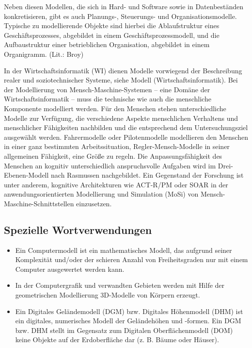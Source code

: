 \documentclass[a4paper, 12pt]{scrartcl}
\begin{document}
Neben diesen Modellen, die sich in Hard- und Software sowie in Datenbeständen konkretisieren, gibt es auch Planungs-, Steuerungs- und Organisationsmodelle. Typische zu modellierende Objekte sind hierbei die Ablaufstruktur eines Geschäftsprozesses, abgebildet in einem Geschäftsprozessmodell, und die Aufbaustruktur einer betrieblichen Organisation, abgebildet in einem Organigramm. (Lit.: Broy)

In der Wirtschaftsinformatik (WI) dienen Modelle vorwiegend der Beschreibung realer und soziotechnischer Systeme, siehe Modell (Wirtschaftsinformatik). Bei der Modellierung von Mensch-Maschine-Systemen – eine Domäne der Wirtschaftsinformatik – muss die technische wie auch die menschliche Komponente modelliert werden. Für den Menschen stehen unterschiedliche Modelle zur Verfügung, die verschiedene Aspekte menschlichen Verhaltens und menschlicher Fähigkeiten nachbilden und die entsprechend dem Untersuchungsziel ausgewählt werden. Fahrermodelle oder Pilotenmodelle modellieren den Menschen in einer ganz bestimmten Arbeitssituation, Regler-Mensch-Modelle in seiner allgemeinen Fähigkeit, eine Größe zu regeln. Die Anpassungsfähigkeit des Menschen an kognitiv unterschiedlich anspruchsvolle Aufgaben wird im Drei-Ebenen-Modell nach Rasmussen nachgebildet. Ein Gegenstand der Forschung ist unter anderem, kognitive Architekturen wie ACT-R/PM oder SOAR in der anwendungsorientierten Modellierung und Simulation (MoSi) von Mensch-Maschine-Schnittstellen einzusetzen.

\subsection*{Spezielle Wortverwendungen}
\begin{itemize}
    \item Ein Computermodell ist ein mathematisches Modell, das aufgrund seiner Komplexität und/oder der schieren Anzahl von Freiheitsgraden nur mit einem Computer ausgewertet werden kann.
    \item In der Computergrafik und verwandten Gebieten werden mit Hilfe der geometrischen Modellierung 3D-Modelle von Körpern erzeugt.
    \item Ein Digitales Geländemodell (DGM) bzw. Digitales Höhenmodell (DHM) ist ein digitales, numerisches Modell der Geländehöhen und -formen. Ein DGM bzw. DHM stellt im Gegensatz zum Digitalen Oberflächenmodell (DOM) keine Objekte auf der Erdoberfläche dar (z. B. Bäume oder Häuser).
\end{itemize}
\end{document}

